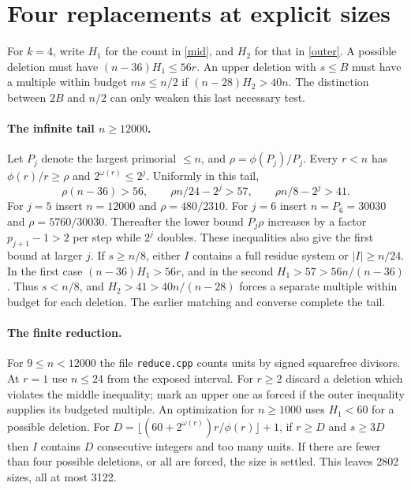 \section{Four replacements at explicit sizes}
For $k=4$, write $H_1$ for the count in \eqref{mid}, and $H_2$ for that in \eqref{outer}. A possible deletion must have $(n-36)H_1\le56r$. An upper deletion with $s\le B$ must have a multiple within budget $ms\le n/2$ if $(n-28)H_2>40n$. The distinction between $2B$ and $n/2$ can only weaken this last necessary test.

\paragraph{The infinite tail $n\ge12000$.}
Let $P_j$ denote the largest primorial $\le n$, and $\rho=\phi(P_j)/P_j$. Every $r<n$ has $\phi(r)/r\ge\rho$ and $2^{\omega(r)}\le 2^j$. Uniformly in this tail,
\[
 \rho(n-36)>56,\qquad \rho n/24-2^j>57,\qquad \rho n/8-2^j>41 .
\]
For $j=5$ insert $n=12000$ and $\rho=480/2310$. For $j=6$ insert $n=P_6=30030$ and $\rho=5760/30030$. Thereafter the lower bound $P_j\rho$ increases by a factor $p_{j+1}-1>2$ per step while $2^j$ doubles. These inequalities also give the first bound at larger $j$. If $s\ge n/8$, either $I$ contains a full residue system or $|I|\ge n/24$. In the first case $(n-36)H_1>56r$, and in the second $H_1>57>56n/(n-36)$. Thus $s<n/8$, and $H_2>41>40n/(n-28)$ forces a separate multiple within budget for each deletion. The earlier matching and converse complete the tail.

\paragraph{The finite reduction.}
For $9\le n<12000$ the file \texttt{reduce.cpp} counts units by signed squarefree divisors. At $r=1$ use $n\le24$ from the exposed interval. For $r\ge2$ discard a deletion which violates the middle inequality; mark an upper one as forced if the outer inequality supplies its budgeted multiple. An optimization for $n\ge1000$ uses $H_1<60$ for a possible deletion. For $D=\lfloor(60+2^{\omega(r)})r/\phi(r)\rfloor+1$, if $r\ge D$ and $s\ge3D$ then $I$ contains $D$ consecutive integers and too many units. If there are fewer than four possible deletions, or all are forced, the size is settled. This leaves 2802 sizes, all at most 3122.

